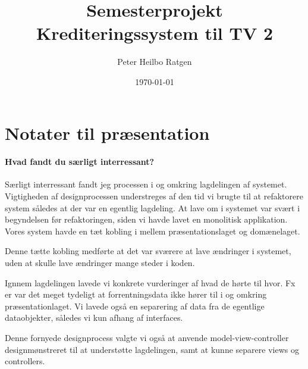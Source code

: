 \documentclass{article}
\title{Semesterprojekt \\ Krediteringssystem til TV 2}
\author{Peter Heilbo Ratgen}
\date{\today}
\begin{document}
\maketitle

\section{Notater til præsentation}%
\label{sec:notater_til_praesentation}

\paragraph{Hvad fandt du særligt interressant?}%
\label{par:hvad_fandt_du_saerligt_interressant}
Særligt interressant fandt jeg processen i og omkring lagdelingen af systemet.
Vigtigheden af designprocessen understreges af den tid vi brugte til at
refaktorere system således at der var en egentlig lagdeling. At lave om i
systemet var svært i begyndelsen før refaktoringen, siden vi havde lavet en
monolitisk applikation. Vores system havde en tæt kobling i mellem
præsentationslaget og domænelaget. 

Denne tætte kobling medførte at det var sværere at lave ændringer i systemet,
uden at skulle lave ændringer mange steder i koden.

Ignnem lagdelingen lavede vi konkrete vurderinger af hvad de hørte til hvor. Fx
er var det meget tydeligt at forrentningsdata ikke hører til i og omkring
præsentationlaget. Vi lavede også en separering af data fra de egentlige
dataobjekter, således vi kun afhang af interfaces.

Denne fornyede designprocess valgte vi også at anvende
model-view-controller designmønstreret til at understøtte lagdelingen, samt at
kunne separere views og controllers.
\end{document}
